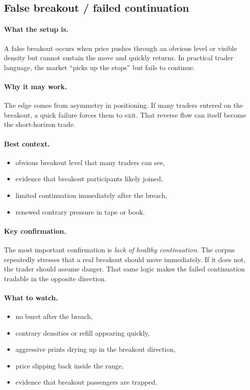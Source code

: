 
\subsection{False breakout / failed continuation}

\paragraph{What the setup is.} A false breakout occurs when price pushes through an obvious level or visible density but cannot sustain the move and quickly returns. In practical trader language, the market ``picks up the stops'' but fails to continue.

\paragraph{Why it may work.} The edge comes from asymmetry in positioning. If many traders entered on the breakout, a quick failure forces them to exit. That reverse flow can itself become the short-horizon trade.

\paragraph{Best context.}
\begin{itemize}
\item obvious breakout level that many traders can see,
\item evidence that breakout participants likely joined,
\item limited continuation immediately after the breach,
\item renewed contrary pressure in tape or book.
\end{itemize}

\paragraph{Key confirmation.} The most important confirmation is \emph{lack of healthy continuation}. The corpus repeatedly stresses that a real breakout should move immediately. If it does not, the trader should assume danger. That same logic makes the failed continuation tradable in the opposite direction.

\paragraph{What to watch.}
\begin{itemize}
\item no burst after the breach,
\item contrary densities or refill appearing quickly,
\item aggressive prints drying up in the breakout direction,
\item price slipping back inside the range,
\item evidence that breakout passengers are trapped.
\end{itemize}

